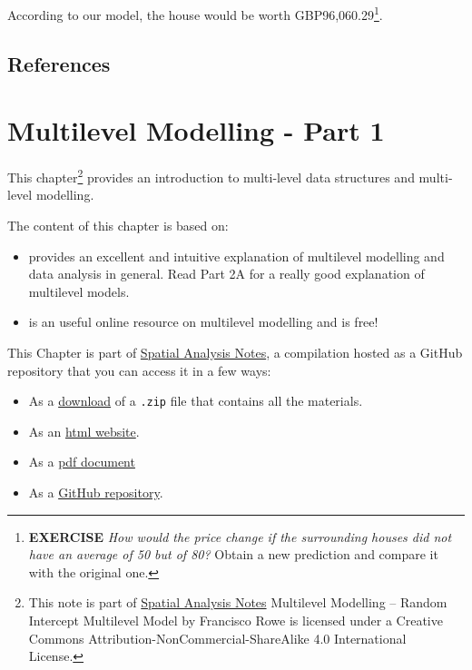 \documentclass[]{book}
\providecommand{\tightlist}{%
  \setlength{\itemsep}{0pt}\setlength{\parskip}{0pt}}
\begin{document}
According to our model, the house would be worth GBP96,060.29\footnote{\textbf{EXERCISE}
  \emph{How would the price change if the surrounding houses did not
  have an average of 50 but of 80?} Obtain a new prediction and compare
  it with the original one.}.

\section{References}\label{references-1}

\chapter{Multilevel Modelling - Part
1}\label{multilevel-modelling---part-1}

This chapter\footnote{This note is part of \href{index.html}{Spatial
  Analysis Notes} {Multilevel Modelling -- Random Intercept Multilevel
  Model} by Francisco Rowe is licensed under a Creative Commons
  Attribution-NonCommercial-ShareAlike 4.0 International License.}
provides an introduction to multi-level data structures and multi-level
modelling.

The content of this chapter is based on:

\begin{itemize}
\item
  \citet{Gelman_Hill_2006_book} provides an excellent and intuitive
  explanation of multilevel modelling and data analysis in general. Read
  Part 2A for a really good explanation of multilevel models.
\item
  \citet{bristol2020} is an useful online resource on multilevel
  modelling and is free!
\end{itemize}

This Chapter is part of \href{index.html}{Spatial Analysis Notes}, a
compilation hosted as a GitHub repository that you can access it in a
few ways:

\begin{itemize}
\tightlist
\item
  As a
  \href{https://github.com/GDSL-UL/san/archive/master.zip}{download} of
  a \texttt{.zip} file that contains all the materials.
\item
  As an
  \href{https://gdsl-ul.github.io/san/multilevel-modelling-part-1.html}{html
  website}.
\item
  As a
  \href{https://gdsl-ul.github.io/san/spatial_analysis_notes.pdf}{pdf
  document}
\item
  As a \href{https://github.com/GDSL-UL/san}{GitHub repository}.
\end{itemize}
\end{document}
